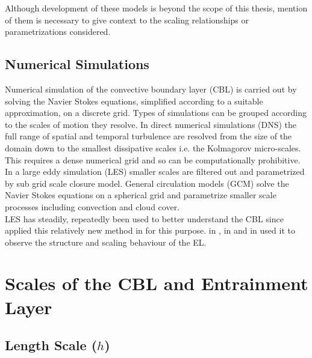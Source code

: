 Although development of these models is beyond the scope of this thesis, mention of them is necessary to give context to the scaling 
relationships or parametrizations considered. \\         

\subsection{Numerical Simulations}
\label{subsec:}

Numerical simulation of the convective boundary layer (\acs{CBL}) is carried out by solving the Navier Stokes equations, simplified according to a suitable approximation, on a discrete grid.  Types of simulations can be grouped according to the scales of motion they resolve.  In direct numerical simulations (\acs{DNS}) the full range of spatial and temporal turbulence are resolved from the size of the domain down to the smallest dissipative scales i.e. the Kolmagorov micro-scales.  This requires a dense numerical grid and so can be computationally prohibitive.  In a large eddy simulation (\acs{LES}) smaller scales are filtered out and parametrized by sub grid scale closure model. General circulation models (\acs{GCM}) solve the Navier Stokes equations on a spherical grid and parametrize smaller scale processes including convection and cloud cover.\\

\acs{LES} has steadily, repeatedly been used to better understand the \acs{CBL} since \citeauthor{Deardorff72} applied this relatively 
new method in \cite{Deardorff72} for this purpose.  \citeauthor{SullMoengStev} in \cite{SullMoengStev}, \citeauthor{FedConzMir04} in \cite{FedConzMir04} and \citeauthor{BrooksFowler2} in \cite{BrooksFowler2} used it to observe the structure and scaling behaviour of the \acs{EL}.\\

\section{Scales of the CBL and Entrainment Layer}
\label{sec:scales}

\subsection{Length Scale ($h$)}
\label{subsec:}

